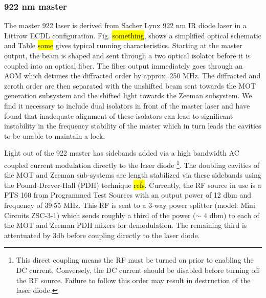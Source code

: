 \subsubsection{922 nm master}
The master 922 laser is derived from Sacher Lynx 922 nm IR diode laser in a Littrow ECDL configuration.
Fig. \hl{something}, shows a simplified optical schematic and Table \hl{some} gives typical running characteristics.
Starting at the master output, the beam is shaped and sent through a two optical isolator before it is coupled into an optical fiber.
The fiber output immediately goes through an AOM which detunes the diffracted order by approx. 250 MHz.
The diffracted and zeroth order are then separated with the unshifted beam sent towards the MOT generation subsystem and the shifted light towards the Zeeman subsystem.
We find it necessary to include dual isolators in front of the master laser and have found that inadequate alignment of these isolators can lead to significant instability in the frequency stability of the master which in turn leads the cavities to be unable to maintain a lock.

Light out of the 922 master has sidebands added via a high bandwidth AC coupled current modulation directly to the laser diode 
\footnote{This direct coupling means the RF must be turned on prior to enabling the DC current. 
Conversely, the DC current should be disabled before turning off the RF source. 
Failure to follow this order may result in destruction of the laser diode.}.
The doubling cavities of the MOT and Zeeman sub-systems are length stabilized via these sidebands using the Pound-Drever-Hall (PDH) technique \hl{refs}.
Currently, the RF source in use is a PTS 160 from Programmed Test Sources with an output power of 12 dbm and frequency of 39.55 MHz.
This RF is sent to a 3-way power splitter (model: Mini Circuits ZSC-3-1) which sends roughly a third of the power ($\sim$ 4 dbm) to each of the MOT and Zeeman PDH mixers for demodulation. 
The remaining third is attentuated by 3db before coupling directly to the laser diode.

